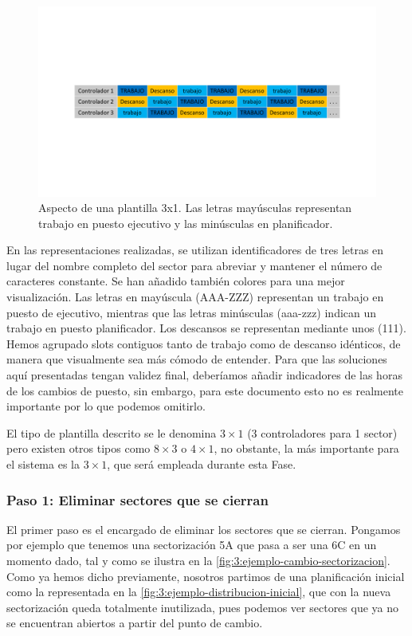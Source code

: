 \begin{figure}
	\centering
	\includegraphics[width=0.9\linewidth]{capitulos/Capitulo3-Metodologia-propuesta/recursos/Plantilla-3x1}
	\caption[Aspecto de una plantilla 3x1]{Aspecto de una plantilla 3x1. Las letras mayúsculas representan trabajo en 
		puesto ejecutivo y las minúsculas en planificador.}
	\label{fig:3:plantilla-3x1}
\end{figure}

En las representaciones realizadas, se utilizan identificadores de tres letras en lugar del nombre completo del sector para abreviar y mantener el número de caracteres constante. Se han añadido también colores para una mejor visualización.
Las letras en mayúscula (AAA-ZZZ) representan un trabajo en puesto de ejecutivo, mientras que las letras minúsculas (aaa-zzz) indican un trabajo en puesto planificador. Los descansos se representan mediante unos (111).
Hemos agrupado slots contiguos tanto de trabajo como de descanso idénticos, de manera que visualmente sea más cómodo de entender. Para que las soluciones aquí presentadas tengan validez final, deberíamos añadir indicadores de las horas de los cambios de puesto, sin embargo, para este documento esto no es realmente importante por lo que podemos omitirlo.

El tipo de plantilla descrito se le denomina $3\times1$ (3 controladores para 1 sector) pero existen otros tipos como $8\times3$ o $4\times1$, no obstante, la más importante para el sistema es la $3\times1$, que será empleada durante esta Fase.

\subsubsection{Paso 1: Eliminar sectores que se cierran}
El primer paso es el encargado de eliminar los sectores que se cierran. Pongamos por ejemplo que tenemos una 
sectorización 5A que pasa a ser una 6C en un momento dado, tal y como se ilustra en la 
\autoref{fig:3:ejemplo-cambio-sectorizacion}. Como ya hemos dicho previamente, nosotros partimos de una planificación inicial como la representada en la \autoref{fig:3:ejemplo-distribucion-inicial}, que con la nueva sectorización queda totalmente inutilizada, pues podemos ver sectores que ya no se encuentran abiertos a partir del punto de cambio.


